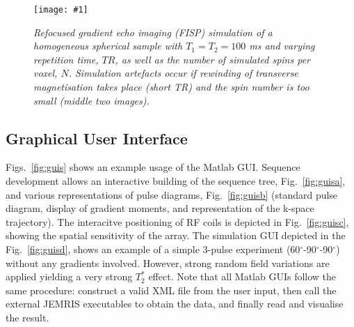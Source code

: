 \documentclass[journal,onecolumn,12pt]{IEEEtran}
\newcommand{\epsfig}[5]{
 \begin{figure}[#4!]
   \begin{center}
    \texttt{[image: \#1]}
    \caption{{\sl #2}\label{#3}}
   \end{center}
 \end{figure}}
\begin{document}
\epsfig{fig/gre_spinnum_ex.eps}{Refocused gradient echo imaging (FISP) simulation of a homogeneous spherical sample with
  $T_1 = T_2 = 100$ ms and varying repetition time, $TR$, as well as the number of simulated spins per voxel, $N$.
  Simulation artefacts occur if rewinding of transverse magnetisation takes place (short TR) and the spin number is too
  small (middle two images).}{fig:spinnumber}{htbp}{1.0}



\subsection{Graphical User Interface}

Figs.~\ref{fig:guis} shows an example usage of the Matlab GUI. Sequence development allows an interactive building of
the sequence tree, Fig.~\ref{fig:guisa}, and various representations of pulse diagrams, Fig.~\ref{fig:guisb} (standard
pulse diagram, display of gradient moments, and representation of the k-space trajectory). The interacitve positioning
of RF coils is depicted in Fig.~\ref{fig:guisc}, showing the spatial sensitivity of the array. The simulation GUI
depicted in the Fig.~\ref{fig:guisd}, shows an example of a simple 3-pulse experiment (60$^\circ$-90$^\circ$-90$^\circ$)
without any gradients involved. However, strong random field variations are applied yielding a very strong $T_{2}^{*}$
effect. Note that all Matlab GUIs follow the same procedure: construct a valid XML file from the user input, then call
the external JEMRIS executables to obtain the data, and finally read and visualise the result.
\end{document}

